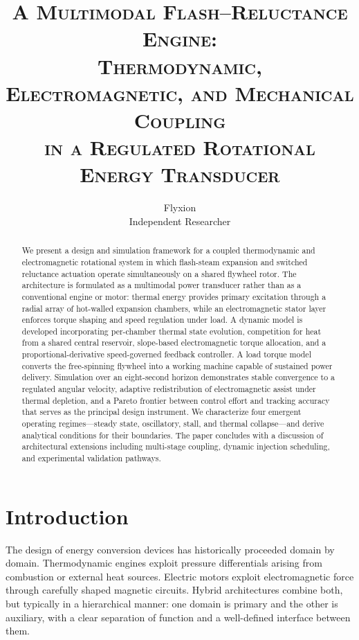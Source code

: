 \documentclass[11pt, a4paper]{article}
\title{%
  \large\scshape A Multimodal Flash--Reluctance Engine:\\[0.4em]
  \normalfont\large
  Thermodynamic, Electromagnetic, and Mechanical Coupling\\
  in a Regulated Rotational Energy Transducer%
}
\author{%
  Flyxion\\
  \small Independent Researcher
}
\date{}
\theoremstyle{plain}
\theoremstyle{definition}
\begin{document}

\maketitle
\thispagestyle{fancy}

\begin{abstract}
\noindent
We present a design and simulation framework for a coupled thermodynamic and electromagnetic rotational system in which flash-steam expansion and switched reluctance actuation operate simultaneously on a shared flywheel rotor. The architecture is formulated as a multimodal power transducer rather than as a conventional engine or motor: thermal energy provides primary excitation through a radial array of hot-walled expansion chambers, while an electromagnetic stator layer enforces torque shaping and speed regulation under load. A dynamic model is developed incorporating per-chamber thermal state evolution, competition for heat from a shared central reservoir, slope-based electromagnetic torque allocation, and a proportional-derivative speed-governed feedback controller. A load torque model converts the free-spinning flywheel into a working machine capable of sustained power delivery. Simulation over an eight-second horizon demonstrates stable convergence to a regulated angular velocity, adaptive redistribution of electromagnetic assist under thermal depletion, and a Pareto frontier between control effort and tracking accuracy that serves as the principal design instrument. We characterize four emergent operating regimes---steady state, oscillatory, stall, and thermal collapse---and derive analytical conditions for their boundaries. The paper concludes with a discussion of architectural extensions including multi-stage coupling, dynamic injection scheduling, and experimental validation pathways.
\end{abstract}

\tableofcontents
\newpage

\section{Introduction}

The design of energy conversion devices has historically proceeded domain by domain. Thermodynamic engines exploit pressure differentials arising from combustion or external heat sources. Electric motors exploit electromagnetic force through carefully shaped magnetic circuits. Hybrid architectures combine both, but typically in a hierarchical manner: one domain is primary and the other is auxiliary, with a clear separation of function and a well-defined interface between them.
\end{document}
